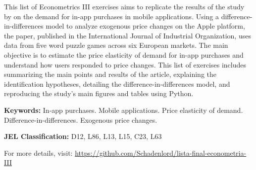 \documentclass[
	article,
	12pt,
	oneside,
	a4paper,
	english,
	brazil,
	sumario=tradicional
]{abntex2}
\begin{document}
\frenchspacing

\maketitle
{}

	\begin{resumoumacoluna}
	\noindent
	This list of Econometrics III exercises aims to replicate the results of the study by \cite{ENACHE2023102945} on the demand for in-app purchases in mobile applications. Using a difference-in-differences model to analyze exogenous price changes on the Apple platform, the paper, published in the International Journal of Industrial Organization, uses data from five word puzzle games across six European markets. The main objective is to estimate the price elasticity of demand for in-app purchases and understand how users responded to price changes. This list of exercises includes summarizing the main points and results of the article, explaining the identification hypotheses, detailing the difference-in-differences model, and reproducing the study's main figures and tables using Python.
	
	\textbf{Keywords:} In-app purchases. Mobile applications. Price elasticity of demand. Difference-in-differences. Exogenous price changes.
	
	\textbf{JEL Classification: }D12, L86, L13, L15, C23, L63

	For more details, visit: \url{https://github.com/Schadenlord/lista-final-econometria-III}

	\end{resumoumacoluna}

\newpage
\end{document}
